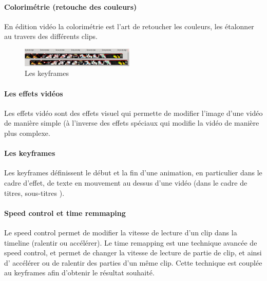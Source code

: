 \paragraph{Colorimétrie (retouche des couleurs)}

En édition vidéo la colorimétrie est l'art de retoucher les couleurs,
les étalonner au travers des différents clips.

\begin{figure}

   \vspace{-20pt}

    \begin{center}

      \includegraphics[width=0.48\textwidth]{images/keyframecurves}

    \end{center}

   \vspace{-30pt} \caption{Les keyframes} \vspace{-10pt} \label{Yes}

\end{figure}

\paragraph{Les effets vidéos}

Les effets vidéo sont des effets visuel qui permette de modifier l'image
d'une vidéo de manière simple (à l'inverse des effets spéciaux qui
modifie la vidéo de manière plus complexe.

\paragraph{Les keyframes}

Les keyframes définissent le début et la fin d'une animation, en
particulier dans le cadre d'effet, de texte en mouvement au dessus d'une
vidéo (dans le cadre de titres, sous-titres ).

\paragraph{Speed control et time remmaping}

Le speed control permet de modifier la vitesse de lecture d'un clip
dans la timeline (ralentir ou accélérer). Le time remapping est une
technique avancée de speed control, et permet de changer la vitesse de
lecture de partie de clip, et ainsi d' accélérer ou de ralentir des
parties d'un même clip. Cette technique est couplée au keyframes afin
d'obtenir le résultat souhaité.

